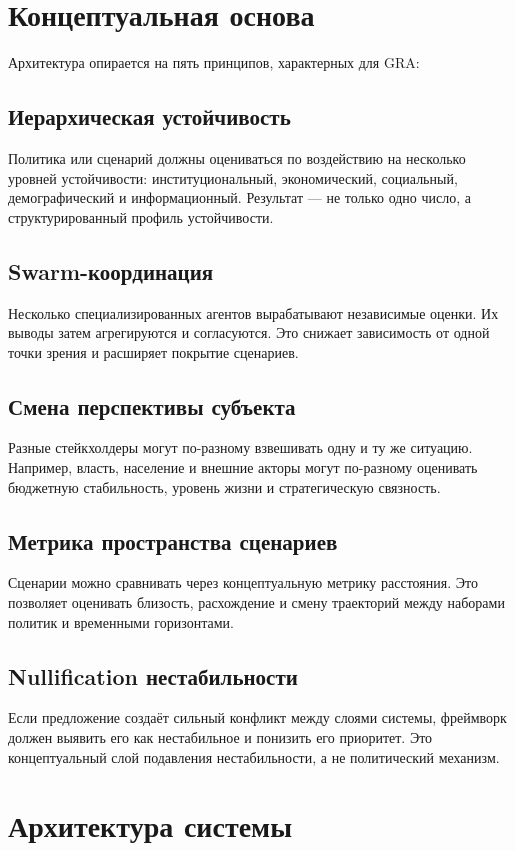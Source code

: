 \documentclass[11pt,a4paper]{article}
\begin{document}
\section{Концептуальная основа}

Архитектура опирается на пять принципов, характерных для GRA:

\subsection{Иерархическая устойчивость}
Политика или сценарий должны оцениваться по воздействию на несколько уровней устойчивости: институциональный, экономический, социальный, демографический и информационный. Результат — не только одно число, а структурированный профиль устойчивости.

\subsection{Swarm-координация}
Несколько специализированных агентов вырабатывают независимые оценки. Их выводы затем агрегируются и согласуются. Это снижает зависимость от одной точки зрения и расширяет покрытие сценариев.

\subsection{Смена перспективы субъекта}
Разные стейкхолдеры могут по-разному взвешивать одну и ту же ситуацию. Например, власть, население и внешние акторы могут по-разному оценивать бюджетную стабильность, уровень жизни и стратегическую связность.

\subsection{Метрика пространства сценариев}
Сценарии можно сравнивать через концептуальную метрику расстояния. Это позволяет оценивать близость, расхождение и смену траекторий между наборами политик и временными горизонтами.

\subsection{Nullification нестабильности}
Если предложение создаёт сильный конфликт между слоями системы, фреймворк должен выявить его как нестабильное и понизить его приоритет. Это концептуальный слой подавления нестабильности, а не политический механизм.

\section{Архитектура системы}
\end{document}
